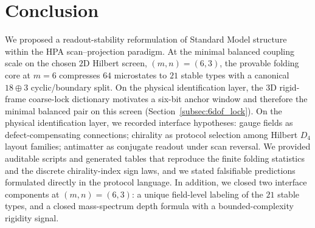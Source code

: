 
\section{Conclusion}
\label{sec:conclusion}

We proposed a readout-stability reformulation of Standard Model structure within the HPA scan--projection paradigm.
At the minimal balanced coupling scale on the chosen $2$D Hilbert screen, $(m,n)=(6,3)$, the provable folding core at $m=6$ compresses $64$ microstates to $21$ stable types with a canonical $18\oplus 3$ cyclic/boundary split.
On the physical identification layer, the $3$D rigid-frame coarse-lock dictionary motivates a six-bit anchor window and therefore the minimal balanced pair on this screen (Section~\ref{subsec:6dof_lock}).
On the physical identification layer, we recorded interface hypotheses: gauge fields as defect-compensating connections; chirality as protocol selection among Hilbert $D_4$ layout families; antimatter as conjugate readout under scan reversal.
We provided auditable scripts and generated tables that reproduce the finite folding statistics and the discrete chirality-index sign laws, and we stated falsifiable predictions formulated directly in the protocol language.
In addition, we closed two interface components at $(m,n)=(6,3)$: a unique field-level labeling of the $21$ stable types, and a closed mass-spectrum depth formula with a bounded-complexity rigidity signal.

